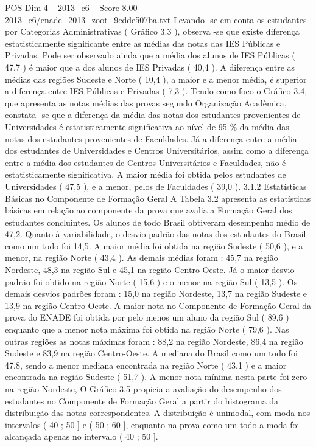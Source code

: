 \begin{textsample}{POS Dim 4 – 2013\_c6 – Score 8.00 – 2013\_c6/enade\_2013\_zoot\_9cdde507ba.txt}
Levando -se em conta os estudantes por Categorias Administrativas ( Gráfico 3.3 ), observa -se que existe diferença estatisticamente significante entre as médias das notas das IES Públicas e Privadas.
Pode ser observado ainda que a média dos alunos de IES Públicas ( 47,7 ) é maior que a dos alunos de IES Privadas ( 40,4 ).
A diferença entre as médias das regiões Sudeste e Norte ( 10,4 ), a maior e a menor média, é superior a diferença entre IES Públicas e Privadas ( 7,3 ).
Tendo como foco o Gráfico 3.4, que apresenta as notas médias das provas segundo Organização Acadêmica, constata -se que a diferença da média das notas dos estudantes provenientes de Universidades é estatisticamente significativa ao nível de 95 \% da média das notas dos estudantes provenientes de Faculdades.
Já a diferença entre a média dos estudantes de Universidades e Centros Universitários, assim como a diferença entre a média dos estudantes de Centros Universitários e Faculdades, não é estatisticamente significativa.
A maior média foi obtida pelos estudantes de Universidades ( 47,5 ), e a menor, pelos de Faculdades ( 39,0 ). 3.1.2 Estatísticas Básicas no Componente de Formação Geral A Tabela 3.2 apresenta as estatísticas básicas em relação ao componente da prova que avalia a Formação Geral dos estudantes concluintes.
Os alunos de todo Brasil obtiveram desempenho médio de 47,2.
Quanto à variabilidade, o desvio padrão das notas dos estudantes do Brasil como um todo foi 14,5.
A maior média foi obtida na região Sudeste ( 50,6 ), e a menor, na região Norte ( 43,4 ).
As demais médias foram : 45,7 na região Nordeste, 48,3 na região Sul e 45,1 na região Centro-Oeste.
Já o maior desvio padrão foi obtido na região Norte ( 15,6 ) e o menor na região Sul ( 13,5 ).
Os demais desvios padrões foram : 15,0 na região Nordeste, 13,7 na região Sudeste e 13,9 na região Centro-Oeste.
A maior nota no Componente de Formação Geral da prova do ENADE foi obtida por pelo menos um aluno da região Sul ( 89,6 ) enquanto que a menor nota máxima foi obtida na região Norte ( 79,6 ).
Nas outras regiões as notas máximas foram : 88,2 na região Nordeste, 86,4 na região Sudeste e 83,9 na região Centro-Oeste.
A mediana do Brasil como um todo foi 47,8, sendo a menor mediana encontrada na região Norte ( 43,1 ) e a maior encontrada na região Sudeste ( 51,7 ).
A menor nota mínima nesta parte foi zero na região Nordeste, O Gráfico 3.5 propicia a avaliação do desempenho dos estudantes no Componente de Formação Geral a partir do histograma da distribuição das notas correspondentes.
A distribuição é unimodal, com moda nos intervalos ( 40 ; 50 ] e ( 50 ; 60 ], enquanto na prova como um todo a moda foi alcançada apenas no intervalo ( 40 ; 50 ].

\end{textsample}
